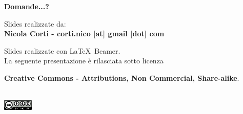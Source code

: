 \documentclass[xcolor=svgnames,11pt]{beamer}
\begin{document}
\begin{frame}{}
\begin{center}
\begin{Huge}
{\color{leorange} \textbf{Domande...?}}
\end{Huge}

\vspace{1.5cm}
\begin{small}
Slides realizzate da:\\
\textbf{Nicola Corti - corti.nico [at] gmail [dot] com}\\

\bigskip

Slides realizzate con \LaTeX\ Beamer.\\
La seguente presentazione \`e rilasciata sotto licenza\\
\begin{footnotesize}	\textbf{Creative Commons - Attributions, Non Commercial, Share-alike}.
\end{footnotesize}
\\
\medskip
\includegraphics[height=0.5cm]{img/cc.png}

\end{small}
\end{center}
\end{frame}
\end{document}

